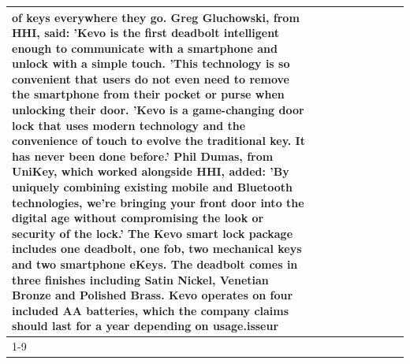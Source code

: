 \begin{table}[H]
\begin{tabular}{lllrlllll}
of keys everywhere they go. Greg Gluchowski, from HHI, said: 'Kevo is the first deadbolt intelligent enough to communicate with a smartphone and unlock with a simple touch. 'This technology is so convenient that users do not even need to remove the smartphone from their pocket or purse when unlocking their door. 'Kevo is a game-changing door lock that uses modern technology and the convenience of touch to evolve the traditional key. It has never been done before.' Phil Dumas, from UniKey, which worked alongside HHI, added: 'By uniquely combining existing mobile and Bluetooth technologies, we’re bringing your front door into the digital age without compromising the look or security of the lock.' The Kevo smart lock package includes one deadbolt, one fob, two mechanical keys and two smartphone eKeys. The deadbolt comes in three finishes including Satin Nickel, Venetian Bronze and Polished Brass. Kevo operates on four included AA batteries, which the company claims should last for a year depending on usage.isseur \\
\cline{1-9}

\end{tabular}
\end{table}
